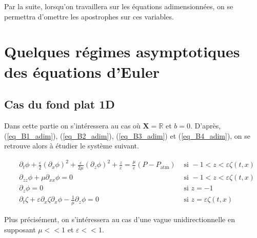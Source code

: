 \documentclass[12pt,a4paper]{article}
\numberwithin{equation}{section}
\begin{document}
Par la suite, lorsqu'on travaillera sur les équations adimensionnées, on se permettra d'omettre les apostrophes sur ces variables.
\newpage
\section{Quelques régimes asymptotiques des équations d'Euler}
\subsection{Cas du fond plat 1D} 

Dans cette partie on s'intéressera au cas où $\textbf{X} = \mathbb{R}$ et $b = 0$. D'après, (\ref{eq_B1_adim}), (\ref{eq_B2_adim}), (\ref{eq_B3_adim}) et (\ref{eq_B4_adim}), on se retrouve alors à étudier le système suivant.

\begin{align}
~&\partial_{t} \phi + 
     \frac{\varepsilon}{2}(\partial_{x}\phi)^2+ \frac{\varepsilon}{2\mu}(\partial_{z}\phi)^2
     + \frac{z}{\varepsilon} 
     = \frac{\mu}{\varepsilon}(P-P_{\text{atm}}) &\text{ si } -1 < z < \varepsilon \zeta(t,x) \label{eq_k1}\\
~&\partial_{zz}\phi + \mu \partial_{x x}\phi  = 0  &\text{ si } -1 < z < \varepsilon \zeta(t,x) \label{eq_k2}\\
~&\partial_{z}\phi = 0&\text{ si } z  = - 1\label{eq_k3}\\
~&\partial_{t}\zeta +  \varepsilon \partial_{x} \zeta  \partial_{x}\phi  - \frac{1}{\mu}\partial_{z}\phi = 0 &\text{ si } z = \varepsilon \zeta(t,x)\label{eq_k4}
\end{align}

Plus précisément, on s'intéressera au cas d'une vague unidirectionnelle en supposant $\mu << 1$ et $\varepsilon<<1$.
\end{document}
